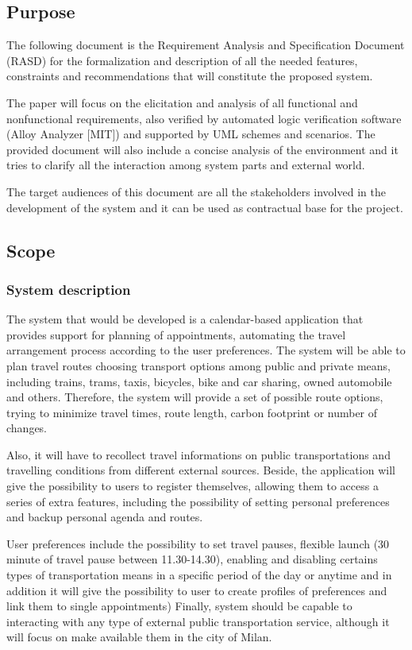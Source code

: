\subsection{Purpose}
The following document is the Requirement Analysis and Specification Document (RASD) for the formalization and description of all the needed features, constraints and recommendations that will constitute the proposed system.

The paper will focus on the elicitation and analysis of all functional and nonfunctional requirements, also verified by automated logic verification software (Alloy Analyzer [MIT]) and supported by UML schemes and scenarios.
The provided document will also include a concise analysis of the environment and it tries to clarify all the interaction among system parts and external world.

The target audiences of this document are all the stakeholders involved in the development of the system and it can be used as contractual base for the project.


\subsection{Scope}

\subsubsection{System description}

The system that would be developed is a calendar-based application that provides support for planning of appointments, automating the travel arrangement process according to the user preferences.
The system will be able to plan travel routes choosing transport options among public and private means, including trains, trams, taxis, bicycles, bike and car sharing, owned automobile and others. Therefore, the system will provide a set of possible route options, trying to minimize travel times, route length, carbon footprint or number of changes.

Also, it will have to recollect travel informations on public transportations and travelling conditions from different external sources.
Beside, the application will give the possibility to users to register themselves, allowing them to access a series of extra features, including the possibility of setting personal preferences and backup personal agenda and routes.

User preferences include the possibility to set travel pauses, flexible launch (30 minute of travel pause between 11.30-14.30), enabling and disabling certains types of transportation means in a specific period of the day or anytime and in addition it will give the possibility to user to create profiles of preferences and link them to single appointments)
Finally, system should be capable to interacting with any type of external public transportation service, although it will focus on make available them in the city of Milan.


